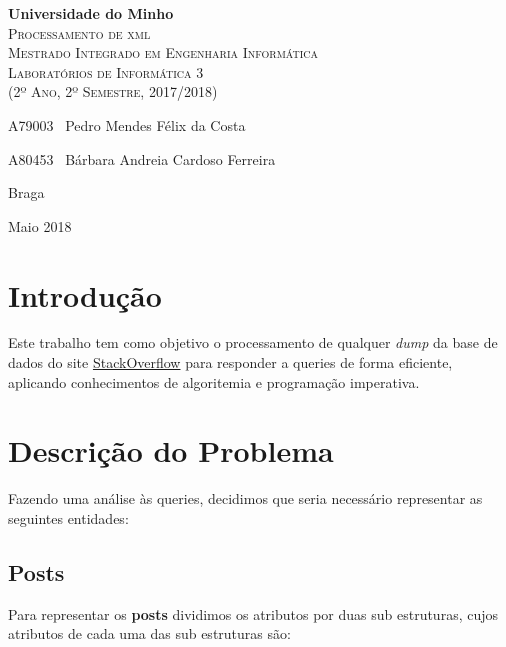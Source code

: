 \documentclass[10pt,a4paper]{article}
\begin{document}
\begin{titlepage}
    \center
    {\huge {\bf Universidade do Minho}}\\[0.4cm]
    \vspace{3.0cm}
    \textsc{\huge{Processamento de xml}}\\[0.5cm] %
    \vspace{3.0cm}
    \textsc{\huge{Mestrado Integrado em Engenharia Informática}}\\[0.5cm]
    \vspace{2.0cm}
    \textsc{Laboratórios de Informática 3}\\[0.5cm]
    \textsc{(2º Ano, 2º Semestre, 2017/2018)}\\[0.5cm]
    \vspace{1.5cm}
    \begin{flushleft}
        A79003 \,\,\,Pedro Mendes Félix da Costa
        \vspace{0.2cm}

        A80453 \,\,\,Bárbara Andreia Cardoso Ferreira
    \end{flushleft}
        \vspace{1cm}
    \begin{flushright}
        Braga

        Maio 2018
    \end{flushright}

\end{titlepage}

\tableofcontents
\clearpage

\section{Introdução}
    Este trabalho tem como objetivo o processamento de qualquer \textit{dump}
    da base de dados do site \href{www.stackoverflow.com}{StackOverflow} para
    responder a queries de forma eficiente, aplicando conhecimentos de
    algoritemia e programação imperativa.

\section{Descrição do Problema}
    Fazendo uma análise às queries, decidimos que seria necessário representar
    as seguintes entidades:

    \subsection{Posts}
    Para representar os \textbf{posts} dividimos os atributos por duas
     sub estruturas, cujos atributos de cada uma das sub estruturas são:
\end{document}

